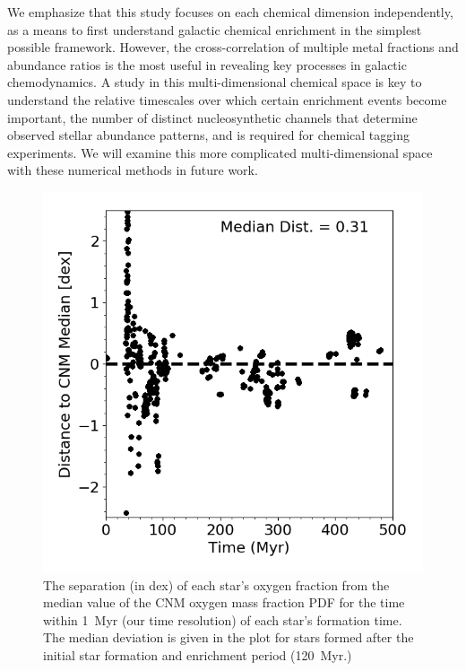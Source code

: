 We emphasize that this study focuses on each chemical dimension independently, as a means to first understand galactic chemical enrichment in the simplest possible framework. However, the cross-correlation of multiple metal fractions and abundance ratios is the most useful in revealing key processes in galactic chemodynamics. A study in this multi-dimensional chemical space is key to understand the relative timescales over which certain enrichment events become important, the number of distinct nucleosynthetic channels that determine observed stellar abundance patterns, and is required for chemical tagging experiments. We will examine this more complicated multi-dimensional space with these numerical methods in future work.

\begin{figure}
\centering
\includegraphics[width=0.95\linewidth]{figures/ch3/stellar_CNM_distance}
\caption{The separation (in dex) of each star's oxygen fraction from the median value of the CNM oxygen mass fraction PDF for the time within 1~Myr (our time resolution) of each star's formation time. The median deviation is given in the plot for stars formed after the initial star formation and enrichment period (120~Myr.)}
\label{fig:stars}
\end{figure}

